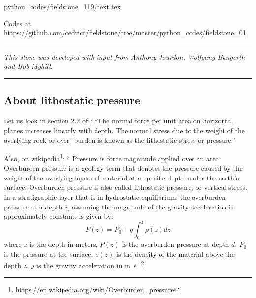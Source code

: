 \begin{flushright} {\tiny {\color{gray} python\_codes/fieldstone\_119/text.tex}} \end{flushright}



\begin{center}

Codes at \url{https://github.com/cedrict/fieldstone/tree/master/python_codes/fieldstone_01}
\end{center}

\par\noindent\rule{\textwidth}{0.4pt}

{\sl This stone was developed with input from Anthony Jourdon, Wolfgang Bangerth and Bob Myhill}. 

\par\noindent\rule{\textwidth}{0.4pt}

\subsection*{About lithostatic pressure}

Let us look in section 2.2 of \textcite{tusc}:
``The normal force per unit area on horizontal planes increases linearly with
depth. The normal stress due to the weight of the overlying rock or over-
burden is known as the lithostatic stress or pressure.''

Also, on wikipedia\footnote{\url{https://en.wikipedia.org/wiki/Overburden_pressure}}:
``
Pressure is force magnitude applied over an area. Overburden pressure is a geology term that denotes the pressure caused by 
the weight of the overlying layers of material at a specific depth under the earth's surface.
Overburden pressure is also called lithostatic pressure, or vertical stress.
In a stratigraphic layer that is in hydrostatic equilibrium; the overburden pressure at a depth $z$, assuming the magnitude 
of the gravity acceleration is approximately constant, is given by: 
\[
P(z)=P_0 + g \int_0^z \rho(z) dz
\]
where $z$ is the depth in meters, $P(z)$ is the overburden pressure at depth $d$,
$P_0$ is the pressure at the surface, $\rho(z)$ is the density of the material above the depth $z$,
$g$ is the gravity acceleration in \si{\meter\per\square\second}.

